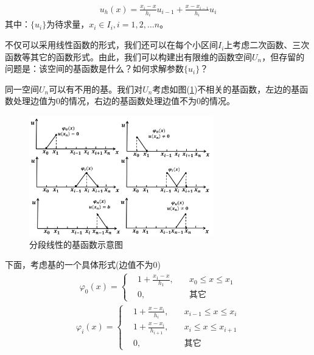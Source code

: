             \begin{align*}
                u_h(x) = \frac{x_i - x}{h_i} u_{i-1} + \frac{x- x_{i-1}}{h_i} u_{i}
            \end{align*}
            其中：$\{u_i\}$为待求量，$x_i\in I_i,i = 1,2,\dots n$。
            \par
            不仅可以采用线性函数的形式，我们还可以在每个小区间$I_i$上考虑二次函数、三次函数等其它的函数形式。由此，我们可以构建出有限维的函数空间$U_n$，但存留的问题是：该空间的基函数是什么？如何求解参数$\{u_i\}$？
            \par
            同一空间$U_n$可以有不用的基。我们对$U_n$考虑如图(\ref{fig:分段线性的基函数示意图})不相关的基函数，左边的基函数处理边值为0的情况，右边的基函数处理边值不为0的情况。\\
            \begin{figure}[H]
            \centering
            \includegraphics[width=8cm]{images/Piecewise_linear_basis_func.jpg}
        \caption{分段线性的基函数示意图}
        \label{fig:分段线性的基函数示意图}
        \end{figure}
            下面，考虑基的一个具体形式(边值不为0)
            \begin{align*}
                \varphi_0(x) =
                \left \{
                    \begin{aligned}
                        &1 + \frac{x_1 - x}{h_1} , \quad &x_0 \leqslant x \leqslant x_1 \\
                        &0,\quad &\text{其它}
                    \end{aligned}
                 \right.
            \end{align*}
            \begin{align*}
                \varphi_i(x) =
                \left \{
                    \begin{aligned}
                        &1 + \frac{x - x_i}{h_i} , \quad &x_{i-1} \leqslant x \leqslant x_{i } \\
                        &1 + \frac{x - x_i}{h_{i+1}} , \quad &x_{i} \leqslant x \leqslant x_{i + 1} \\
                        &0, \quad &\text{其它}
                    \end{aligned}
                 \right.
            \end{align*}
